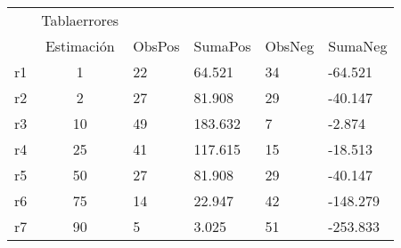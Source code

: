 \begin{tabular}{l*{1}{c}} \hline\hline
            &Tablaerrores&            &            &            &            \\
            & Estimación&      ObsPos&     SumaPos&      ObsNeg&     SumaNeg\\
\hline
r1          &           1&          22&      64.521&          34&     -64.521\\
r2          &           2&          27&      81.908&          29&     -40.147\\
r3          &          10&          49&     183.632&           7&      -2.874\\
r4          &          25&          41&     117.615&          15&     -18.513\\
r5          &          50&          27&      81.908&          29&     -40.147\\
r6          &          75&          14&      22.947&          42&    -148.279\\
r7          &          90&           5&       3.025&          51&    -253.833\\
\hline\hline
\end{tabular}
